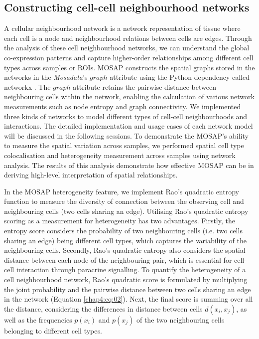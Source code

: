 \subsection{Constructing cell-cell neighbourhood networks}
A cellular neighbourhood network is a network representation of tissue where each cell is a node and neighbourhood relations between cells are edges. Through the analysis of these cell neighbourhood networks, we can understand the global co-expression patterns and capture higher-order relationships among different cell types across samples or ROIs. MOSAP constructs the spatial graphs stored in the networks in the \textit{Mosadata}'s $graph$ attribute using the Python dependency called networkx \cite{hagberg2008exploring}. The $graph$ attribute retains the pairwise distance between neighbouring cells within the network, enabling the calculation of various network measurements such as node entropy and graph connectivity. We implemented three kinds of networks to model different types of cell-cell neighbourhoods and interactions. The detailed implementation and usage cases of each network model will be discussed in the following sessions. To demonstrate the MOSAP's ability to measure the spatial variation across samples, we performed spatial cell type colocalisation and heterogeneity measurement across samples using network analysis. The results of this analysis demonstrate how effective MOSAP can be in deriving high-level interpretation of spatial relationships. 

In the MOSAP heterogeneity feature, we implement Rao’s quadratic entropy \cite{pienta2008ecological,botta2005rao} function to measure the diversity of connection between the observing cell and neighbouring cells (\ie two cells sharing an edge). Utilising Rao’s quadratic entropy scoring as a measurement for heterogeneity has two advantages. Firstly, the entropy score considers the probability of two neighbouring cells (i.e. two cells sharing an edge) being different cell types, which captures the variability of the neighbouring cells. Secondly, Rao’s quadratic entropy also considers the spatial distance between each node of the neighbouring pair, which is essential for cell-cell interaction through paracrine signalling. To quantify the heterogeneity of a cell neighbourhood network, Rao's quadratic score is formulated by multiplying the joint probability and the pairwise distance between two cells sharing an edge in the network (Equation \ref{chap4:eq:02}). Next, the final score is summing over all the distance, considering the differences in distance between cells $d(x_i, x_j)$, as well as the frequencies $p(x_i)$ and $p(x_j)$ of the two neighbouring cells belonging to different cell types.      

